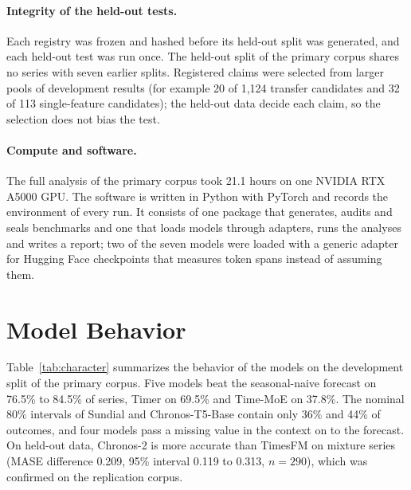 \documentclass[twoside,11pt]{article}
\begin{document}
\paragraph{Integrity of the held-out tests.}
Each registry was frozen and hashed before its held-out split was generated, and each held-out test was run once.
The held-out split of the primary corpus shares no series with seven earlier splits.
Registered claims were selected from larger pools of development results (for example 20 of 1{,}124 transfer candidates and 32 of 113 single-feature candidates); the held-out data decide each claim, so the selection does not bias the test.

\paragraph{Compute and software.}
The full analysis of the primary corpus took 21.1 hours on one NVIDIA RTX A5000 GPU.
The software is written in Python with PyTorch and records the environment of every run.
It consists of one package that generates, audits and seals benchmarks and one that loads models through adapters, runs the analyses and writes a report; two of the seven models were loaded with a generic adapter for Hugging Face checkpoints that measures token spans instead of assuming them.

\section{Model Behavior}
\label{app:behavior}

Table~\ref{tab:character} summarizes the behavior of the models on the development split of the primary corpus.
Five models beat the seasonal-naive forecast on 76.5\% to 84.5\% of series, Timer on 69.5\% and Time-MoE on 37.8\%.
The nominal 80\% intervals of Sundial and Chronos-T5-Base contain only 36\% and 44\% of outcomes, and four models pass a missing value in the context on to the forecast.
On held-out data, Chronos-2 is more accurate than TimesFM on mixture series (MASE difference 0.209, 95\% interval 0.119 to 0.313, $n=290$), which was confirmed on the replication corpus.
\end{document}
